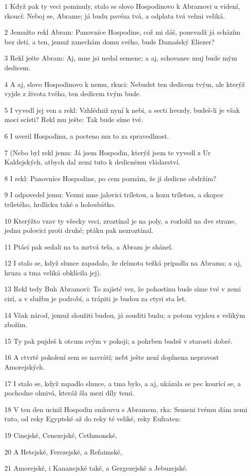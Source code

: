 \par 1 Když pak ty veci pominuly, stalo se slovo Hospodinovo k Abramovi u videní, rkoucí: Neboj se, Abrame; já budu pavéza tvá, a odplata tvá velmi veliká.
\par 2 Jemužto rekl Abram: Panovníce Hospodine, což mi dáš, ponevadž já scházím bez detí, a ten, jemuž zanechám domu svého, bude Damašský Eliezer?
\par 3 Rekl ješte Abram: Aj, mne jsi nedal semene; a aj, schovanec muj bude mým dedicem.
\par 4 A aj, slovo Hospodinovo k nemu, rkuci: Nebudet ten dedicem tvým, ale kterýž vyjde z života tvého, ten dedicem tvým bude.
\par 5 I vyvedl jej ven a rekl: Vzhlédniž nyní k nebi, a secti hvezdy, budeš-li je však moci scísti? Rekl mu ješte: Tak bude síme tvé.
\par 6 I uveril Hospodinu, a pocteno mu to za spravedlnost.
\par 7 (Nebo byl rekl jemu: Já jsem Hospodin, kterýž jsem te vyvedl z Ur Kaldejských, atbych dal zemi tuto k dedicnému vládarství.
\par 8 I rekl: Panovníce Hospodine, po cem poznám, že ji dedicne obdržím?
\par 9 I odpovedel jemu: Vezmi mne jalovici tríletou, a kozu tríletou, a skopce tríletého, hrdlicku také a holoubátko.
\par 10 Kterýžto vzav ty všecky veci, zroztínal je na poly, a rozložil na dve strane, jednu polovici proti druhé; ptáku pak nezroztínal.
\par 11 Ptáci pak sedali na ta mrtvá tela, a Abram je shánel.
\par 12 I stalo se, když slunce zapadalo, že drímota težká pripadla na Abrama; a aj, hruza a tma veliká obklícila jej).
\par 13 Rekl tedy Buh Abramovi: To zajisté vez, že pohostinu bude síme tvé v zemi cizí, a v službu je podrobí, a trápiti je budou za ctyri sta let.
\par 14 Však národ, jemuž sloužiti budou, já souditi budu; a potom vyjdou s velikým zbožím.
\par 15 Ty pak pujdeš k otcum svým v pokoji; a pohrben budeš v starosti dobré.
\par 16 A ctvrté pokolení sem se navrátí; nebt ješte není doplnena nepravost Amorejských.
\par 17 I stalo se, když zapadlo slunce, a tma bylo, a aj, ukázala se pec kourící se, a pochodne ohnivá, kteráž šla mezi díly temi.
\par 18 V ten den ucinil Hospodin smlouvu s Abramem, rka: Semeni tvému dám zemi tuto, od reky Egyptské až do reky té veliké, reky Eufraten:
\par 19 Cinejské, Cenezejské, Cethmonské,
\par 20 A Hetejské, Ferezejské, a Refaimské,
\par 21 Amorejské, i Kananejské také, a Gergezejské a Jebuzejské.

